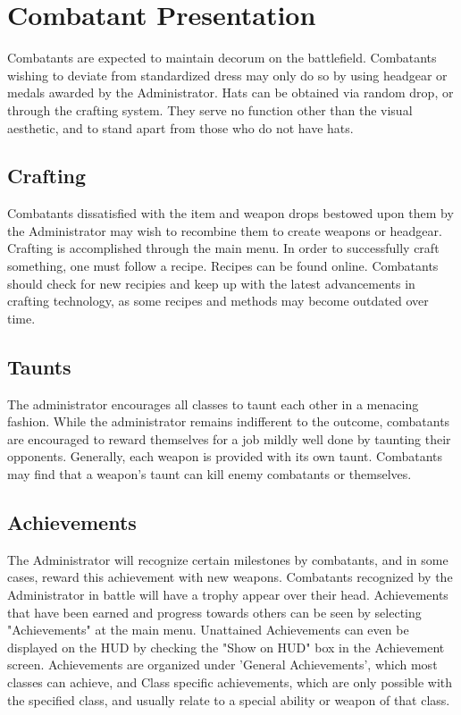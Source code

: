 \section{Combatant Presentation}
Combatants are expected to maintain decorum on the battlefield.  Combatants wishing to deviate from standardized dress may only do so by using headgear or medals awarded by the Administrator. Hats can be obtained via random drop, or through the crafting system. They serve no function other than the visual aesthetic, and to stand apart from those who do not have hats.

\subsection{Crafting}
Combatants dissatisfied with the item and weapon drops bestowed upon them by the Administrator may wish to recombine them to create weapons or headgear.  Crafting is accomplished through the main menu.  In order to successfully craft something, one must follow a recipe.  Recipes can be found online. Combatants should check for new recipies and keep up with the latest advancements in crafting technology, as some recipes and methods may become outdated over time. 

\subsection{Taunts}
The administrator encourages all classes to taunt each other in a menacing fashion. While the administrator remains indifferent to the outcome, combatants are encouraged to reward themselves for a job mildly well done by taunting their opponents. Generally, each weapon is provided with its own taunt. Combatants may find that a weapon's taunt can kill enemy combatants or themselves.
 
\subsection{Achievements}
\label{Achievements}
The Administrator will recognize certain milestones by combatants, and in some cases, reward this achievement with new weapons. Combatants recognized by the Administrator in battle will have a trophy appear over their head. Achievements that have been earned and progress towards others can be seen by selecting "Achievements" at the main menu. Unattained Achievements can even be displayed on the HUD by checking the "Show on HUD" box in the Achievement screen.  Achievements are organized under 'General Achievements', which most classes can achieve, and Class specific achievements, which are only possible with the specified class, and usually relate to a special ability or weapon of that class.